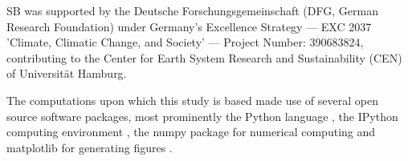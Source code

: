 \documentclass[journal abbreviation, manuscript]{copernicus}
\begin{document}

\appendixfigures  %

\appendixtables   %








\begin{acknowledgements}


SB was supported by the Deutsche Forschungsgemeinschaft (DFG, German Research
Foundation) under Germany's Excellence Strategy --- EXC 2037 'Climate,
Climatic Change, and Society' --- Project Number: 390683824,
contributing to the Center for Earth System Research and
Sustainability (CEN) of Universit\"{a}t Hamburg. 

The computations upon which this study is based made use of several open source software
packages, most prominently the Python language \citep{python}, the IPython computing environment
\citep{ipython}, the numpy package for numerical computing \citep{numpy} and matplotlib for generating
figures \citep{matplotlib}.
\end{acknowledgements}







\end{document}
